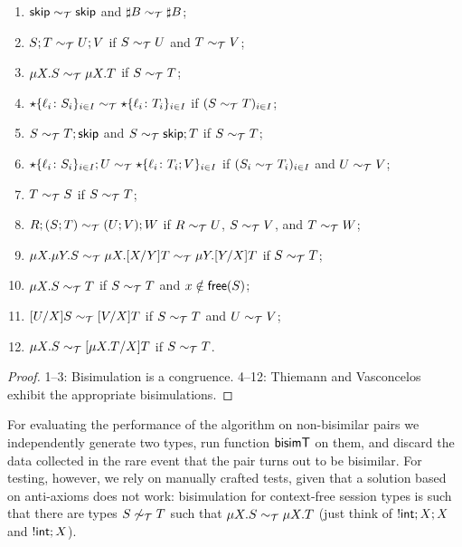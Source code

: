 \begin{theorem}
\label{thm:axioms}
  \begin{enumerate}
  \item $\mathsf{skip} \sim_\mathcal T \mathsf{skip}$ and $\sharp B \sim_\mathcal T \sharp B$;
  \item $S;T \sim_\mathcal T U;V$ if $S \sim_\mathcal T U$ and $T \sim_\mathcal T V$;
  \item $\mu X.S \sim_\mathcal T \mu X.T$ if $S \sim_\mathcal T T$;
  \item $\star\{\ell_i\colon S_i\}_{i\in I}\sim_\mathcal T
    \star\{\ell_i\colon T_i\}_{i\in I}$ if $(S \sim_\mathcal T T)_{i\in
      I}$;
  \item $S\sim_\mathcal T T;\mathsf{skip}$ and $S\sim_\mathcal T \mathsf{skip};T$ if $S \sim_\mathcal T T$;
  \item $\star\{\ell_i\colon S_i\}_{i\in I};U\sim_\mathcal T
    \star\{\ell_i\colon T_i;V\}_{i\in I}$ if $(S_i \sim_\mathcal T T_i)_{i\in
      I}$ and $U \sim_\mathcal T V$;
  \item $T \sim_\mathcal T S$ if $S \sim_\mathcal T T$;
  \item $R;(S;T) \sim_\mathcal T (U;V);W$ if $R \sim_\mathcal T U$, $S \sim_\mathcal T V$, and $T\sim_\mathcal T W$;
  \item
    $\mu X.\mu Y.S \sim_\mathcal T \mu X.[{X}/{Y}]T \sim_\mathcal T \mu Y.[{Y}/{X}]T$ if $S \sim_\mathcal T T$;
  \item $\mu X.S \sim_\mathcal T T$ if $S \sim_\mathcal T T$ and $x\notin\mathsf{free}(S)$;
  \item $[{U}/{X}]S\sim_\mathcal T [{V}/{X}]T$  if $S \sim_\mathcal T T$ and $U \sim_\mathcal T V$;
  \item $\mu X.S \sim_\mathcal T [{\mu X.T}/{X}]T$ if $S \sim_\mathcal T T$.
  \end{enumerate}
\end{theorem}
%
\begin{proof}
  1--3: Bisimulation is a congruence. 4--12: Thiemann and
  Vasconcelos~\cite{thiemann2016context} exhibit the appropriate
  bisimulations.
\end{proof}

For evaluating the performance of the algorithm on non-bisimilar 
pairs we independently
generate two types, run function $\mathsf{bisimT}$ on them, and discard the
data collected in the rare event that the pair turns out to be
bisimilar.
%
For testing, however, we rely on manually crafted tests, given that a
solution based on anti-axioms does not work: bisimulation for
context-free session types is such that there are types
$S \not\sim_\mathcal T T$ such that $\mu X.S \sim_\mathcal T \mu X.T$ (just think of
$!\mathsf{int};X;X$ and $!\mathsf{int};X$).

